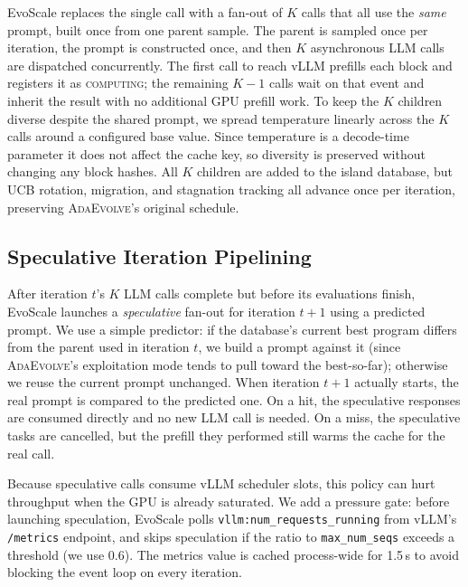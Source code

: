 \documentclass{article}
\newcommand{\adaev}{\textsc{AdaEvolve}}
\begin{document}
EvoScale replaces the single call with a fan-out of $K$ calls that all
use the \emph{same} prompt, built once from one parent sample. The
parent is sampled once per iteration, the prompt is constructed once,
and then $K$ asynchronous LLM calls are dispatched concurrently. The
first call to reach vLLM prefills each block and registers it as
\textsc{computing}; the remaining $K-1$ calls wait on that event and
inherit the result with no additional GPU prefill work. To keep the $K$
children diverse despite the shared prompt, we spread temperature
linearly across the $K$ calls around a configured base value. Since
temperature is a decode-time parameter it does not affect the cache key,
so diversity is preserved without changing any block hashes. All $K$
children are added to the island database, but UCB rotation, migration,
and stagnation tracking all advance once per iteration, preserving
\adaev{}'s original schedule.

\subsection{Speculative Iteration Pipelining}

After iteration $t$'s $K$ LLM calls complete but before its evaluations
finish, EvoScale launches a \emph{speculative} fan-out for iteration
$t{+}1$ using a predicted prompt. We use a simple predictor: if the
database's current best program differs from the parent used in
iteration $t$, we build a prompt against it (since \adaev{}'s
exploitation mode tends to pull toward the best-so-far); otherwise we
reuse the current prompt unchanged. When iteration $t{+}1$ actually
starts, the real prompt is compared to the predicted one. On a hit, the
speculative responses are consumed directly and no new LLM call is
needed. On a miss, the speculative tasks are cancelled, but the prefill
they performed still warms the cache for the real call.

Because speculative calls consume vLLM scheduler slots, this policy can
hurt throughput when the GPU is already saturated. We add a pressure
gate: before launching speculation, EvoScale polls
\texttt{vllm:num\_requests\_running} from vLLM's \texttt{/metrics}
endpoint, and skips speculation if the ratio to \texttt{max\_num\_seqs}
exceeds a threshold (we use 0.6). The metrics value is cached
process-wide for 1.5\,s to avoid blocking the event loop on every
iteration.

\end{document}
